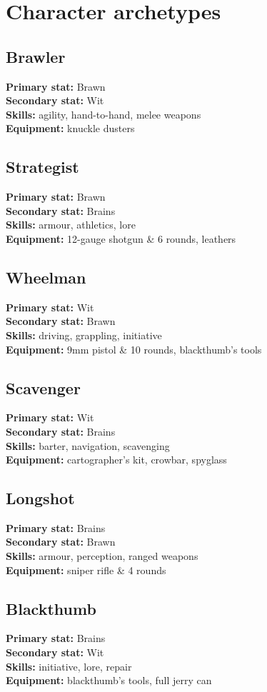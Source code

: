 \documentclass[10pt, a4paper, twocolumn]{article}
\begin{document}
\section{Character archetypes}
\begin{multicols}{2}
\subsection{Brawler}
\textbf{Primary stat:} Brawn\\
\textbf{Secondary stat:} Wit\\
\textbf{Skills:} agility, hand-to-hand, melee weapons\\
\textbf{Equipment:} knuckle dusters
\subsection{Strategist}
\textbf{Primary stat:} Brawn\\
\textbf{Secondary stat:} Brains\\
\textbf{Skills:} armour, athletics, lore\\
\textbf{Equipment:} 12-gauge shotgun \& 6 rounds, leathers
\end{multicols}
\begin{multicols}{2}
\subsection{Wheelman}
\textbf{Primary stat:} Wit\\
\textbf{Secondary stat:} Brawn\\
\textbf{Skills:} driving, grappling, initiative\\
\textbf{Equipment:} 9mm pistol \& 10 rounds, blackthumb's tools
\subsection{Scavenger}
\textbf{Primary stat:} Wit\\
\textbf{Secondary stat:} Brains\\
\textbf{Skills:} barter, navigation, scavenging\\
\textbf{Equipment:} cartographer's kit, crowbar, spyglass
\end{multicols}
\begin{multicols}{2}
\subsection{Longshot}
\textbf{Primary stat:} Brains\\
\textbf{Secondary stat:} Brawn\\
\textbf{Skills:} armour, perception, ranged weapons\\
\textbf{Equipment:} sniper rifle \& 4 rounds
\subsection{Blackthumb}
\textbf{Primary stat:} Brains\\
\textbf{Secondary stat:} Wit\\
\textbf{Skills:} initiative, lore, repair\\
\textbf{Equipment:} blackthumb's tools, full jerry can
\end{multicols}
\end{document}

